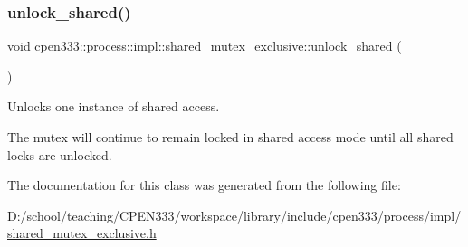 \subsubsection{\texorpdfstring{unlock\+\_\+shared()}{unlock\_shared()}}
{\footnotesize\ttfamily void cpen333\+::process\+::impl\+::shared\+\_\+mutex\+\_\+exclusive\+::unlock\+\_\+shared (\begin{DoxyParamCaption}{ }\end{DoxyParamCaption})\hspace{0.3cm}{\ttfamily [inline]}}



Unlocks one instance of shared access. 

The mutex will continue to remain locked in shared access mode until all shared locks are unlocked. 

The documentation for this class was generated from the following file\+:\begin{DoxyCompactItemize}
\item 
D\+:/school/teaching/\+C\+P\+E\+N333/workspace/library/include/cpen333/process/impl/\hyperlink{process_2impl_2shared__mutex__exclusive_8h}{shared\+\_\+mutex\+\_\+exclusive.\+h}\end{DoxyCompactItemize}

